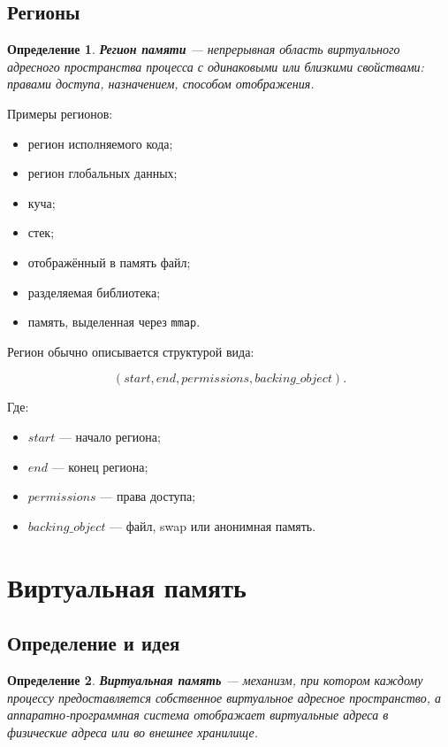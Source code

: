 \documentclass[a4paper,12pt]{article}
\newtheorem{definition}{Определение}
\begin{document}
\subsection{Регионы}

\begin{definition}
\textbf{Регион памяти} --- непрерывная область виртуального адресного пространства процесса с одинаковыми или близкими свойствами: правами доступа, назначением, способом отображения.
\end{definition}

Примеры регионов:

\begin{itemize}
    \item регион исполняемого кода;
    \item регион глобальных данных;
    \item куча;
    \item стек;
    \item отображённый в память файл;
    \item разделяемая библиотека;
    \item память, выделенная через \texttt{mmap}.
\end{itemize}

Регион обычно описывается структурой вида:

\[
(start, end, permissions, backing\_object).
\]

Где:

\begin{itemize}
    \item $start$ --- начало региона;
    \item $end$ --- конец региона;
    \item $permissions$ --- права доступа;
    \item $backing\_object$ --- файл, swap или анонимная память.
\end{itemize}

\section{Виртуальная память}

\subsection{Определение и идея}

\begin{definition}
\textbf{Виртуальная память} --- механизм, при котором каждому процессу предоставляется собственное виртуальное адресное пространство, а аппаратно-программная система отображает виртуальные адреса в физические адреса или во внешнее хранилище.
\end{definition}
\end{document}
